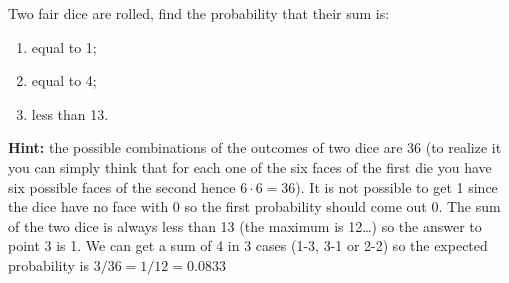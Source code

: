 \begin{Exercise}[title={(Dice simulation II)}]
Two fair dice are rolled, find the probability that their sum is:
\begin{enumerate}[start=1]
	\item equal to 1;
	\item equal to 4;
	\item less than 13.
\end{enumerate}
	
\textbf{Hint:} the possible combinations of the outcomes of two dice are 36 (to realize it you can simply think that for each one of the six faces of the first die you have six possible faces of the second hence $6\cdot 6=36$). It is not possible to get 1 since the dice have no face with 0 so the first probability should come out 0. The sum of the two dice is always less than 13 (the maximum is 12\ldots) so the answer to point 3 is 1. We can get a sum of 4 in 3 cases (1-3, 3-1 or 2-2) so the expected probability is $3/36=1/12=0.0833$
\end{Exercise}

